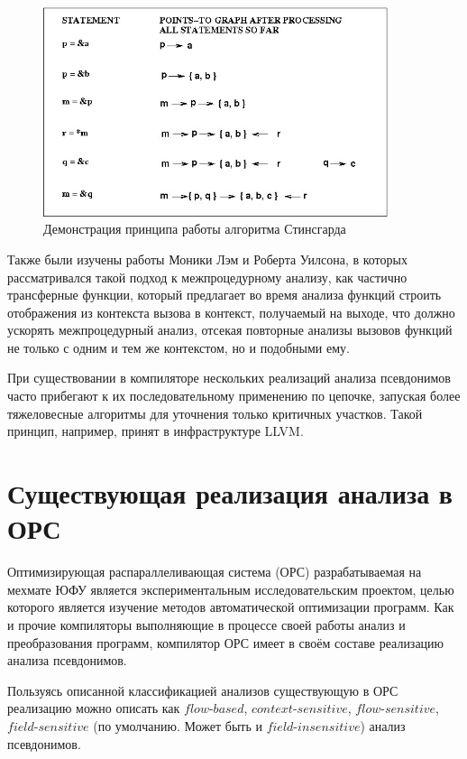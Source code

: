 \begin{figure}[H]
\centering
\includegraphics[width=0.9\textwidth]{img/steensgaard.jpg}
\caption{Демонстрация принципа работы алгоритма Стинсгарда}
\label{fig:steensgaard}
\end{figure}

Также были изучены работы Моники Лэм и Роберта Уилсона, в которых рассматривался такой подход к межпроцедурному анализу, как частично трансферные функции, который предлагает во время анализа функций строить отображения из контекста вызова в контекст, получаемый на выходе, что должно ускорять межпроцедурный анализ, отсекая повторные анализы вызовов функций не только с одним и тем же контекстом, но и подобными ему.

При существовании в компиляторе нескольких реализаций анализа псевдонимов часто прибегают к их последовательному применению по цепочке, запуская более тяжеловесные алгоритмы для уточнения только критичных участков. Такой принцип, например, принят в инфраструктуре LLVM.

\section{Существующая реализация анализа в ОРС}

Оптимизирующая распараллеливающая система (ОРС) разрабатываемая на мехмате ЮФУ является экспериментальным исследовательским проектом, целью которого является изучение методов автоматической оптимизации программ. Как и прочие компиляторы выполняющие в процессе своей работы анализ и преобразования программ, компилятор ОРС имеет в своём составе реализацию анализа псевдонимов.

Пользуясь описанной классификацией анализов существующую в ОРС реализацию можно описать как $flow$-$based$, $context$-$sensitive$, $flow$-$sensitive$, $field$-$sensitive$ (по умолчанию. Может быть и $field$-$insensitive$) анализ псевдонимов.

